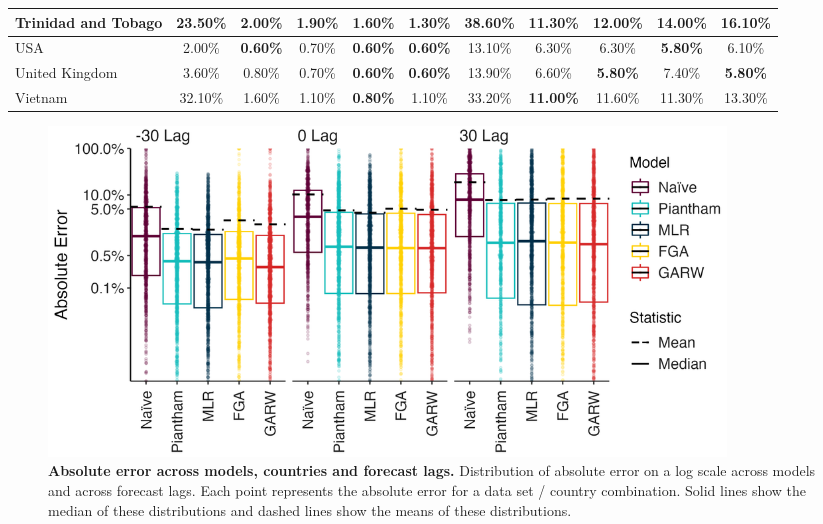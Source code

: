 \begin{table}[!ht]
\begin{adjustbox}{max width=\textwidth}
\begin{tabular}{|l|c|c|c|c|c|c|c|c|c|c|}
        Trinidad and Tobago & 23.50\% & 2.00\% & 1.90\% & 1.60\% & \textbf{1.30\%} & 38.60\% & \textbf{11.30\%} & 12.00\% & 14.00\% & 16.10\% \\ \hline
        USA & 2.00\% &\textbf{0.60\%} & 0.70\% & \textbf{0.60\%} & \textbf{0.60\%} & 13.10\% & 6.30\% & 6.30\% & \textbf{5.80\%} & 6.10\% \\ \hline
        United Kingdom & 3.60\% & 0.80\% & 0.70\% & \textbf{0.60\%} & \textbf{0.60\%} & 13.90\% & 6.60\% & \textbf{5.80\%} & 7.40\% & \textbf{5.80\%} \\ \hline
        Vietnam & 32.10\% & 1.60\% & 1.10\% & \textbf{0.80\%} & 1.10\% & 33.20\% & \textbf{11.00\%} & 11.60\% & 11.30\% & 13.30\% \\ \hline
    \end{tabular}
	\end{adjustbox}
\end{table}


\begin{figure}[tb!]
	\centering
	\includegraphics[width=0.87\textwidth]{figures/model_comp_B.png}
	\caption[\textbf{Absolute error across models, countries and forecast lags.}]{
	\textbf{Absolute error across models, countries and forecast lags.}
	Distribution of absolute error on a log scale across models and across forecast lags.
	Each point represents the absolute error for a data set / country combination.
	Solid lines show the median of these distributions and dashed lines show the means of these distributions.
	}
	\label{fig:Fig3}
\end{figure}

